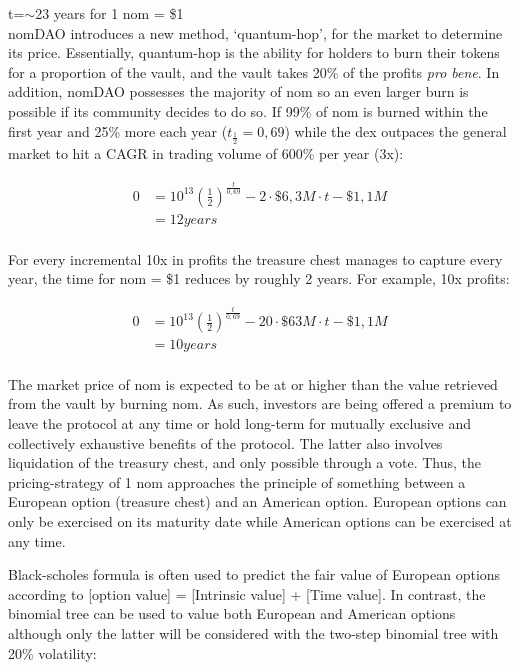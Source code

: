\documentclass[12pt]{article}
\begin{document}
t=$\sim$23 years for 1 nom = \$1\\
nomDAO introduces a new method, ‘quantum-hop’, for the market to determine its price. Essentially, quantum-hop is the ability for holders to burn their tokens for a proportion of the vault, and the vault takes 20\% of the profits \textit{pro bene}. In addition, nomDAO possesses the majority of nom so an even larger burn is possible if its community decides to do so. If 99\% of nom is burned within the first year and 25\% more each year ($t_{\frac{1}{2}}=0,69$) while the dex outpaces the general market to hit a CAGR in trading volume of 600\% per year (3x):

\begin{equation}\label{2x}
\begin{split}
0 &=10^{13}(\frac{1}{2})^\frac{t}{0,69} - 2 \cdot \$6,3M \cdot t-\$1,1M\\
 &= 12years
\end{split}
\end{equation}
\\

For every incremental 10x in profits the treasure chest manages to capture every year, the time for nom = \$1 reduces by roughly 2 years. For example, 10x profits:

\begin{equation}\label{10x}
\begin{split}
0 &=10^{13}(\frac{1}{2})^\frac{t}{0,69} - 20 \cdot \$63M \cdot t-\$1,1M\\
&= 10years
\end{split}
\end{equation}
\\
The market price of nom is expected to be at or higher than the value retrieved from the vault by burning nom. As such, investors are being offered a premium to leave the protocol at any time or hold long-term for mutually exclusive and collectively exhaustive benefits of the protocol. The latter also involves liquidation of the treasury chest, and only possible through a vote. Thus, the pricing-strategy of 1 nom approaches the principle of something between a European option (treasure chest) and an American option. European options can only be exercised on its maturity date while American options can be exercised at any time.

Black-scholes formula \cite{bscholes} is often used to predict the fair value of European options according to [option value] = [Intrinsic value] + [Time value]. In contrast, the binomial tree can be used to value both European and American options although only the latter will be considered with the two-step binomial tree with 20\% volatility:
\end{document}
